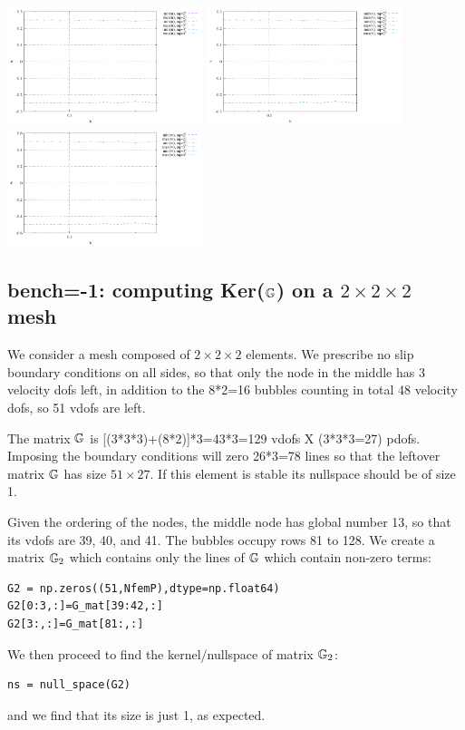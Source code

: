 \begin{center}
\includegraphics[width=5.7cm]{python_codes/fieldstone_82/RESULTS/bench5/u.pdf}
\includegraphics[width=5.7cm]{python_codes/fieldstone_82/RESULTS/bench5/v.pdf}
\includegraphics[width=5.7cm]{python_codes/fieldstone_82/RESULTS/bench5/w.pdf}\\
\end{center}







\newpage
\subsection*{bench=-1: computing Ker(${\mathbb{G}}$) on a $2\times 2 \times 2$ mesh}

We consider a mesh composed of $2\times 2\times 2$ elements. We prescribe no slip boundary conditions 
on all sides, so that only the node in the middle has 3 velocity dofs left, in addition 
to the 8*2=16 bubbles counting in total 48 velocity dofs, so 51 vdofs are left.

The matrix ${\mathbb{G}}$ is [(3*3*3)+(8*2)]*3=43*3=129 vdofs X (3*3*3=27) pdofs. 
Imposing the boundary conditions will zero 26*3=78 lines so that the leftover matrix ${\mathbb{G}}$
has size $51\times 27$. If this element is stable its nullspace should be of size 1. 

Given the ordering of the nodes, the middle node has global number 13, so that 
its vdofs are 39, 40, and 41. The bubbles occupy rows 81 to 128. 
We create a matrix ${\mathbb{G}}_2$ which contains only the lines of ${\mathbb{G}}$ which contain non-zero terms:
\begin{lstlisting}
G2 = np.zeros((51,NfemP),dtype=np.float64)
G2[0:3,:]=G_mat[39:42,:] 
G2[3:,:]=G_mat[81:,:]    
\end{lstlisting}
We then proceed to find the kernel/nullspace of matrix ${\mathbb{G}}_2$:
\begin{lstlisting}
ns = null_space(G2)
\end{lstlisting}
and we find that its size is just 1, as expected. 


